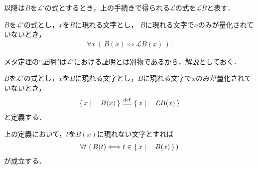 	以降は$B$を$\mathcal{L}'$の式とするとき，上の手続きで得られる$\mathcal{L}$の式を$\mathcal{L}B$と表す．
	
	\begin{screen}
		\begin{metathm}[式の書き換えの同値性]
			$B$を$\mathcal{L}'$の式とし，$x$を$B$に現れる文字とし，
			$B$に現れる文字で$x$のみが量化されていないとき，
			\begin{align}
				\forall x\, \left(\, B(x) \Longleftrightarrow \mathcal{L}B(x)\, \right).
			\end{align}
		\end{metathm}
	\end{screen}
	
	メタ定理の``証明''は$\mathcal{L}'$における証明とは別物であるから，解説としておく．
	
	
	\begin{screen}
		\begin{dfn}
			$B$を$\mathcal{L}'$の式とし，$x$を$B$に現れる文字とし，$B$に現れる文字で$x$のみが量化されていないとき，
			\begin{align}
				\Set{x}{B(x)} \defeq \Set{x}{\mathcal{L}B(x)}
			\end{align}
			と定義する．
		\end{dfn}
	\end{screen}
	
	上の定義において，$t$を$B(x)$に現れない文字とすれば
	\begin{align}
		\forall t\, \left(\, B(t) \Longleftrightarrow t \in \left\{\, x \mid \quad B(x)\, \right\}\, \right)
	\end{align}
	が成立する．
	